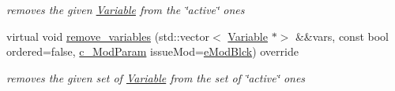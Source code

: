 \begin{Indent}
\begin{DoxyCompactItemize}
\begin{DoxyCompactList}\small\item\em removes the given \mbox{\hyperlink{class_s_m_spp__di__unipi__it_1_1_variable}{Variable}} from the \char`\"{}active\char`\"{} ones \end{DoxyCompactList}\item 
virtual void \mbox{\hyperlink{class_s_m_spp__di__unipi__it_1_1_f_real_objective_a46c11bb15648f9976eee469c53099b11}{remove\+\_\+variables}} (std\+::vector$<$ \mbox{\hyperlink{class_s_m_spp__di__unipi__it_1_1_variable}{Variable}} $\ast$$>$ \&\&vars, const bool ordered=false, \mbox{\hyperlink{group___modification___t_y_p_e_s_ga544246d8c462e9a2d817c2c30797968f}{c\+\_\+\+Mod\+Param}} issue\+Mod=\mbox{\hyperlink{group___modification___t_y_p_e_s_gga48fddcdd03a03f49b7e389ca1ed938d4a21b14b26b1c0093a0905f6fc010bad29}{e\+Mod\+Blck}}) override
\begin{DoxyCompactList}\small\item\em removes the given set of \mbox{\hyperlink{class_s_m_spp__di__unipi__it_1_1_variable}{Variable}} from the set of \char`\"{}active\char`\"{} ones \end{DoxyCompactList}\end{DoxyCompactItemize}
\end{Indent}
